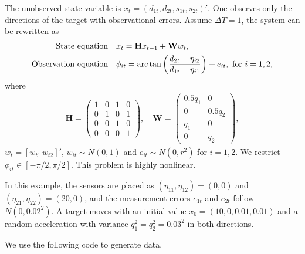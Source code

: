 The unobserved state variable is $x_t=(d_{1t},d_{2t},s_{1t},s_{2t})'$. One observes only the directions of the target with observational errors. Assume $\Delta T=1$, the system can be rewritten as
\begin{align}
\mbox{State equation}&\quad  x_t=\mathbf{H} x_{t-1} +\mathbf{W} w_t \label{state_eq},\\
\mbox{Observation equation} & \quad \phi_{it}={\rm arc} \, {\rm tan} \left(\frac{d_{2t}-\eta_{i2}}{d_{1t}-\eta_{i1}} \right)+e_{it}, \mbox{ for } i=1,2, \label{ob_eq}
\end{align}
where 
\begin{align*}
\mathbf{H}=
\begin{pmatrix}
1	&0	&1	&0\\
0	&1	&0	&1\\
0	&0	&1	&0\\
0	&0	&0	&1
\end{pmatrix}, \quad \mathbf{W}=
\begin{pmatrix}
0.5q_1 &0 	\\
0	&0.5q_2\\
q_1	&0\\
0	&q_2
\end{pmatrix},
\end{align*}
$w_t=[w_{t1}\, w_{t2}]'$, $w_{it} \sim N(0,1)$ and $e_{it} \sim N(0, r^2)$ for $i=1,2$. We restrict $\phi_{it} \in [-\pi/2, \pi/2]$. This problem is highly nonlinear.

In this example, the sensors are placed as $(\eta_{11},\eta_{12})=(0,0)$ and $(\eta_{21},\eta_{22})=(20,0)$, and the measurement errors $e_{1t}$ and $e_{2t}$ follow $N(0,0.02^2)$. A target moves with an initial value $x_0=(10,0,0.01,0.01)$ and a random acceleration with variance $q_1^2=q_2^2=0.03^2$ in both directions. 

We use the following code to generate data.

